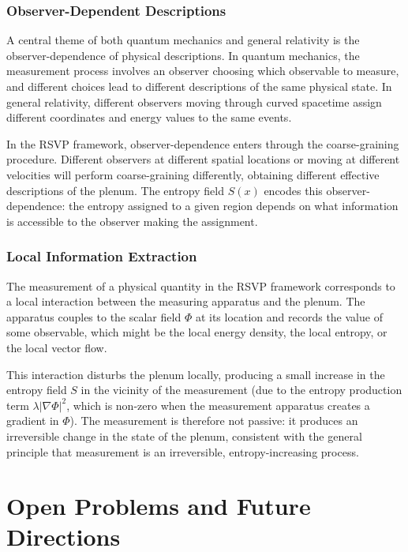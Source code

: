 \documentclass[12pt,a4paper,oneside]{book}
\theoremstyle{definition}
\theoremstyle{plain}
\theoremstyle{remark}
\begin{document}
\section{Observer-Dependent Descriptions}

A central theme of both quantum mechanics and general relativity is the
observer-dependence of physical descriptions. In quantum mechanics, the
measurement process involves an observer choosing which observable to measure,
and different choices lead to different descriptions of the same physical state.
In general relativity, different observers moving through curved spacetime
assign different coordinates and energy values to the same events.

In the RSVP framework, observer-dependence enters through the coarse-graining
procedure. Different observers at different spatial locations or moving at
different velocities will perform coarse-graining differently, obtaining
different effective descriptions of the plenum. The entropy field $S(x)$ encodes
this observer-dependence: the entropy assigned to a given region depends on
what information is accessible to the observer making the assignment.

\section{Local Information Extraction}

The measurement of a physical quantity in the RSVP framework corresponds to
a local interaction between the measuring apparatus and the plenum. The
apparatus couples to the scalar field $\Phi$ at its location and records the
value of some observable, which might be the local energy density, the local
entropy, or the local vector flow.

This interaction disturbs the plenum locally, producing a small increase in
the entropy field $S$ in the vicinity of the measurement (due to the entropy
production term $\lambda|\nabla\Phi|^2$, which is non-zero when the measurement
apparatus creates a gradient in $\Phi$). The measurement is therefore not
passive: it produces an irreversible change in the state of the plenum,
consistent with the general principle that measurement is an irreversible,
entropy-increasing process.

\part{Open Problems and Future Directions}
\end{document}
